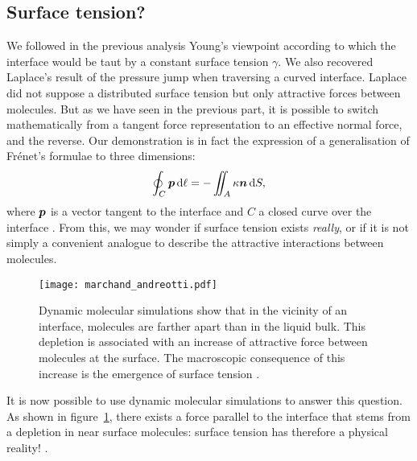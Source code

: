 \subsection{Surface tension?}
We followed in the previous analysis Young's viewpoint according to which the interface would be taut by a constant surface tension $\gamma$. We also recovered Laplace's result of the pressure jump when traversing a curved interface. Laplace did not suppose a distributed surface tension but only attractive forces between molecules. But as we have seen in the previous part, it is possible to switch mathematically from a tangent force representation to an effective normal force, and the reverse. Our demonstration is in fact the expression of a generalisation of Frénet's formulae to three dimensions:
\begin{equation}
\oint_C \bp\,\mathrm d\ell = -\iint_A \kappa \bn\, \mathrm dS,
\end{equation}
where $\bp$ is a vector tangent to the interface and $C$ a closed curve over the interface \citep{Tryggvason2011}. From this, we may wonder if surface tension exists \textit{really}, or if it is not simply a convenient analogue to describe the attractive interactions between molecules.
\begin{figure}[htbp]
\begin{center}
\texttt{[image: marchand\_andreotti.pdf]} 
\end{center}
\caption{Dynamic molecular simulations show that in the vicinity of an interface, molecules are farther apart than in the liquid bulk. This depletion is associated with an increase of attractive force between molecules at the surface. The macroscopic consequence of this increase is the emergence of surface tension \citep{Marchand2011}.}
\label{fig:marchand}
\end{figure}
It is now possible to use dynamic molecular simulations to answer this question. As shown in figure~\ref{fig:marchand}, there exists a force parallel to the interface that stems from a depletion in near surface molecules: surface tension has therefore a physical reality! \citep{Berry1971,Marchand2011}.
 

